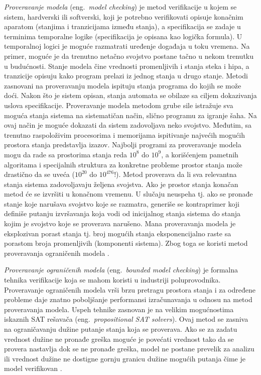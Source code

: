 \documentclass[12pt,oneside]{memoir}
\begin{document}
\textit{Proveravanje modela} (eng.~\textit{model checking}) je metod verifikacije u kojem se sistem, hardverski ili softverski, koji je potrebno verifikovati opisuje konačnim aparatom (stanjima i tranzicijama između stanja), a specifikacija se zadaje u terminima temporalne logike (specifikacija je opisana kao logička formula). U temporalnoj logici je moguće razmatrati uređenje događaja u toku vremena. Na primer, moguće je da trenutno netačno svojstvo postane tačno u nekom trenutku u budućnosti. Stanje modela čine vrednosti promenljivih i stanja steka i hipa, a tranzicije opisuju kako program prelazi iz jednog stanja u drugo stanje. Metodi zasnovani na proveravanju modela ispituju stanja programa do kojih se može doći. Nakon što je sistem opisan, stanja automata se obilaze sa ciljem dokazivanja uslova specifikacije. Proveravanje modela metodom grube sile istražuje sva moguća stanja sistema na sistematičan način, slično programu za igranje šaha. Na ovaj način je moguće dokazati da sistem zadovoljava neko svojstvo. Međutim, sa trenutno raspoloživim procesorima i memorijama ispitivanje najvećih mogućih prostora stanja predstavlja izazov. Najbolji programi za proveravanje modela mogu da rade sa prostorima stanja reda $10^8$ do $10^9$, a korišćenjem pametnih algoritama i specijalnih struktura za konkretne probleme prostor stanja može drastično da se uveća ($10^{20}$ do $10^{476}$!). Metod proverava da li sva relevantna stanja sistema zadovoljavaju željena svojstva. Ako je prostor stanja konačan metod će se izvršiti u konačnom vremenu. U slučaju neuspeha tj. ako se pronađe stanje koje narušava svojstvo koje se razmatra, generiše se kontraprimer koji definiše putanju izvršavanja koja vodi od inicijalnog stanja sistema do stanja kojim je svojstvo koje se proverava narušeno. Mana proveravanja modela je eksplozivan porast stanja tj. broj mogućih stanja eksponencijalno raste sa porastom broja promenljivih (komponenti sistema). Zbog toga se koristi metod proveravanja ograničenih modela \cite{mvj, AutoTechnFormSofVer, BMCUSS, PoMC}.

\textit{Proveravanje ograničenih modela} (eng.~\textit{bounded model checking})  je formalna tehnika verifikacije koja se mahom koristi u industriji poluprovodnika. Proveravanje ograničenih modela vrši brzu pretragu prostora stanja i za određene probleme daje znatno poboljšanje performansi izračunavanja u odnosu na metod proveravanja modela. Uspeh tehnike zasnovan je na velikim mogućnostima iskaznih SAT rešavača (eng.~\textit{propositional SAT solvers}). Ovaj metod se zasniva na ograničavanju dužine putanje stanja koja se proverava. Ako se za zadatu vrednost dužine ne pronađe greška moguće je povećati vrednost tako da se provera nastavlja dok se ne pronađe greška, model ne postane prevelik za analizu ili vrednost dužine ne dostigne gornju granicu dužine mogućih putanja čime je model verifikovan  \cite{mvj, AutoTechnFormSofVer, BMCUSS}.
\end{document}
